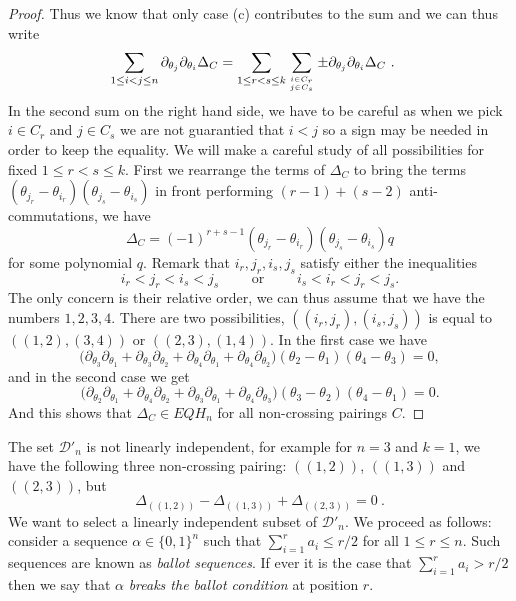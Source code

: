 \documentclass[11pt]{amsart}
\newcommand{\defncolor}{\color{darkred}}
\newcommand{\defn}[1]{{\defncolor\emph{#1}}} %
\theoremstyle{definition}
\numberwithin{equation}{section}
\begin{document}
\begin{proof}
Thus we know that only case (c) contributes to the sum and we can thus write
\begin{align*}
 \sum_{1\le i<j\le n} \partial_{\theta_j}\partial_{\theta_i}\Delta_C
 &= \sum_{1\le r<s\le k} \sum_{i\in C_{r} \atop j\in C_{s}} \pm  \partial_{\theta_j}\partial_{\theta_i}\Delta_C~.
\end{align*}
In the second sum on the right hand side, we have to be careful as when we pick $i\in C_{r}$ and $ j\in C_{s}$ we are not guarantied that $i<j$ so a sign may be needed 
in  order to keep the equality. We will make a careful study of all possibilities for fixed $1\le r<s\le k$. First we rearrange the terms of $\Delta_C$ to  bring the terms 
$(\theta_{j_{r}}-\theta_{i_{r}})(\theta_{j_{s}}-\theta_{i_{s}})$ in front  performing $(r-1)+(s-2)$ anti-commutations, we have 
  $$\Delta_C  =(-1)^{r+s-1}(\theta_{j_{r}}-\theta_{i_{r}})(\theta_{j_{s}}-\theta_{i_{s}})q$$
  for some polynomial $q$. Remark that $i_{r},j_{r},i_{s},j_{s}$ satisfy either the inequalities
  $$  i_r<j_r<i_s<j_s \qquad \text{ or }\qquad  i_s<i_r<j_r<j_s.$$
 The only concern is their relative order, we can thus assume that we have the numbers $1,2,3,4$.
  There are two possibilities, $((i_r,j_r), (i_s,j_s))$ is equal to $((1,2),(3,4))$ or $((2,3),(1,4))$.
  In the first case we have
$$ \big( \partial_{\theta_3}\partial_{\theta_1} +  \partial_{\theta_3}\partial_{\theta_2} +  \partial_{\theta_4}\partial_{\theta_1} +  \partial_{\theta_4}\partial_{\theta_2}\big)
     (\theta_{2}-\theta_{1})(\theta_{4}-\theta_{3}) =0,
$$  
 and in the second case we get 
$$ \big( \partial_{\theta_2}\partial_{\theta_1} +  \partial_{\theta_4}\partial_{\theta_2} +  \partial_{\theta_3}\partial_{\theta_1} +  \partial_{\theta_4}\partial_{\theta_3}\big)
     (\theta_{3}-\theta_{2})(\theta_{4}-\theta_{1}) =0.
$$  
And this shows that $\Delta_C\in EQH_n $ for all non-crossing pairings $C$.
\end{proof}

The set ${\mathcal D}'_n$ is not linearly independent, for example for $n=3$ and $k=1$, we have the following three non-crossing pairing:
$((1,2))$, $((1,3))$ and $((2,3))$, but
\[
\Delta_{((1,2))} - \Delta_{((1,3))} + \Delta_{((2,3))} =0 ~.
\]
We want to select a linearly independent subset of ${\mathcal D}'_n$. We proceed as follows:
consider a sequence
$\alpha \in \{0, 1\}^n$ such that $\sum_{i=1}^r a_i \leq r/2$ for all $1 \leq r \leq n$. 
Such sequences are known as \defn{ballot sequences}.
If ever it is the case that $\sum_{i=1}^r a_i > r/2$ then we say that
$\alpha$ \defn{breaks the ballot condition} at position $r$.
\end{document}
